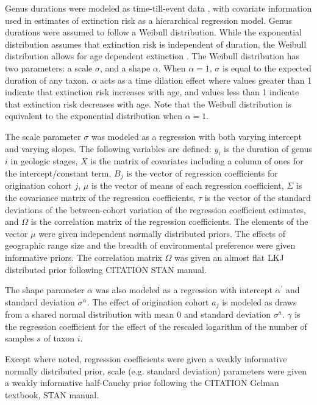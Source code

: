 \documentclass[12pt,letterpaper]{article}
\begin{document}
Genus durations were modeled as time-till-event data \citep{Klein2003}, with covariate information used in estimates of extinction risk as a hierarchical regression model. Genus durations were assumed to follow a Weibull distribution. While the exponential distribution assumes that extinction risk is independent of duration, the Weibull distribution allows for age dependent extinction \citep{Klein2003}. The Weibull distribution has two parameters: a scale \(\sigma\), and a shape \(\alpha\). When \(\alpha = 1\), \(\sigma\) is equal to the expected duration of any taxon. \(\alpha\) acts as a time dilation effect where values greater than 1 indicate that extinction risk increases with age, and values less than 1 indicate that extinction risk decreases with age. Note that the Weibull distribution is equivalent to the exponential distribution when \(\alpha = 1\). 

The scale parameter \(\sigma\) was modeled as a regression with both varying intercept and varying slopes. The following variables are defined: \(y_{i}\) is the duration of genus \(i\) in geologic stages, \(X\) is the matrix of covariates including a column of ones for the intercept/constant term, \(B_{j}\) is the vector of regression coefficients for origination cohort \(j\), \(\mu\) is the vector of means of each regression coefficient, \(\Sigma\) is the covariance matrix of the regression coefficients, \(\tau\) is the vector of the standard deviations of the between-cohort variation of the regression coefficient estimates, and \(\Omega\) is the correlation matrix of the regression coefficients. The elements of the vector \(\mu\) were given independent normally distributed priors. The effects of geographic range size and the breadth of environmental preference were given informative priors. The correlation matrix \(\Omega\) was given an almost flat LKJ distributed prior following CITATION STAN manual.

The shape parameter \(\alpha\) was also modeled as a regression with intercept \(\alpha^{\prime}\) and standard deviation \(\sigma^{\alpha}\). The effect of origination cohort \(a_{j}\) is modeled as draws from a shared normal distribution with mean 0 and standard deviation \(\sigma^{a}\). \(\gamma\) is the regression coefficient for the effect of the rescaled logarithm of the number of samples \(s\) of taxon \(i\).

Except where noted, regression coefficients were given a weakly informative normally distributed prior, scale (e.g. standard deviation) parameters were given a weakly informative half-Cauchy prior following the CITATION Gelman textbook, STAN manual. 
\end{document}

